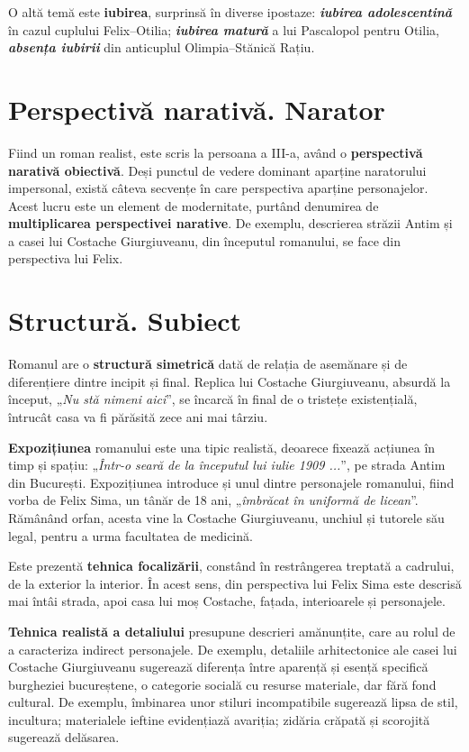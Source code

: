 \documentclass{article}
\newcommand{\qu}[1]{„\emph{#1}”}
\begin{document}
O altă temă este \textbf{iubirea}, surprinsă în diverse ipostaze: \textsl{\textbf{iubirea adolescentină}} în cazul cuplului Felix--Otilia; \textsl{\textbf{iubirea matură}} a lui Pascalopol pentru Otilia, \textsl{\textbf{absența iubirii}} din anticuplul Olimpia--Stănică Rațiu.

\section{Perspectivă narativă. Narator}
Fiind un roman realist, este scris la persoana a III-a, având o \textbf{perspectivă narativă obiectivă}. Deși punctul de vedere dominant aparține naratorului impersonal, există câteva secvențe în care perspectiva aparține personajelor. Acest lucru este un element de modernitate, purtând denumirea de \textbf{multiplicarea perspectivei narative}. De exemplu, descrierea străzii Antim și a casei lui Costache Giurgiuveanu, din începutul romanului, se face din perspectiva lui Felix.
\section{Structură. Subiect}
Romanul are o \textbf{structură simetrică} dată de relația de asemănare și de diferențiere dintre incipit și final. Replica lui Costache Giurgiuveanu, absurdă la început, \qu{Nu stă nimeni aici}, se încarcă în final de o tristețe existențială, întrucât casa va fi părăsită zece ani mai târziu.

\textbf{Expozițiunea} romanului este una tipic realistă, deoarece fixează acțiunea în timp și spațiu: \qu{Într-o seară de la începutul lui iulie 1909 ...}, pe strada Antim din București. Expozițiunea introduce și unul dintre personajele romanului, fiind vorba de Felix Sima, un tânăr de 18 ani, \qu{îmbrăcat în uniformă de licean}. Rămânând orfan, acesta vine la Costache Giurgiuveanu, unchiul și tutorele său legal, pentru a urma facultatea de medicină.

Este prezentă \textbf{tehnica focalizării}, constând în restrângerea treptată a cadrului, de la exterior la interior. În acest sens, din perspectiva lui Felix Sima este descrisă mai întâi strada, apoi casa lui moș Costache, fațada, interioarele și personajele.

\textbf{Tehnica realistă a detaliului} presupune descrieri amănunțite, care au rolul de a caracteriza indirect personajele. De exemplu, detaliile arhitectonice ale casei lui Costache Giurgiuveanu sugerează diferența între aparență și esență specifică burgheziei bucureștene, o categorie socială cu resurse materiale, dar fără fond cultural. De exemplu, îmbinarea unor stiluri incompatibile sugerează lipsa de stil, incultura; materialele ieftine evidențiază avariția; zidăria crăpată și scorojită sugerează delăsarea.
\end{document}
